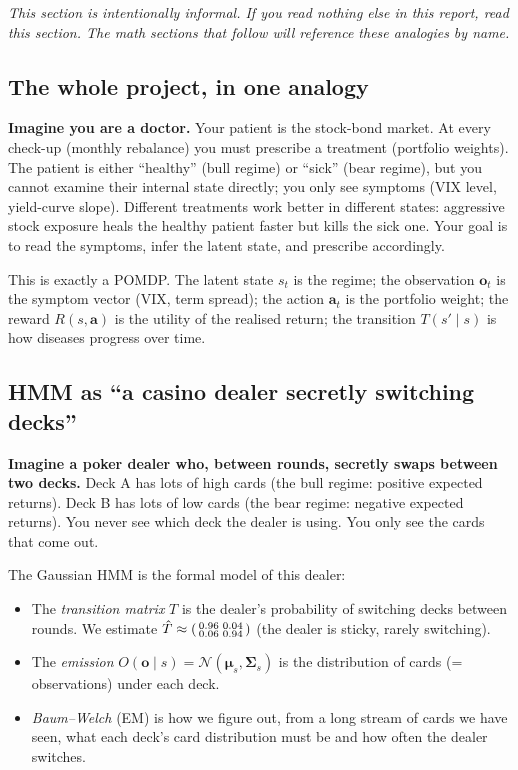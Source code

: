 \documentclass[11pt]{article}
\theoremstyle{plain1}
\theoremstyle{definition1}
\newcommand{\1}{\mathbf{1}}
\begin{document}
\textit{This section is intentionally informal. If you read nothing else in this report, read this section. The math sections that follow will reference these analogies by name.}

\subsection{The whole project, in one analogy}

\textbf{Imagine you are a doctor.} Your patient is the stock-bond market. At every check-up (monthly rebalance) you must prescribe a treatment (portfolio weights). The patient is either ``healthy'' (bull regime) or ``sick'' (bear regime), but you cannot examine their internal state directly; you only see symptoms (VIX level, yield-curve slope). Different treatments work better in different states: aggressive stock exposure heals the healthy patient faster but kills the sick one. Your goal is to read the symptoms, infer the latent state, and prescribe accordingly.

This is exactly a POMDP. The latent state $s_t$ is the regime; the observation $\mathbf{o}_t$ is the symptom vector (VIX, term spread); the action $\mathbf{a}_t$ is the portfolio weight; the reward $R(s,\mathbf{a})$ is the utility of the realised return; the transition $T(s'\mid s)$ is how diseases progress over time.

\subsection{HMM as ``a casino dealer secretly switching decks''}

\textbf{Imagine a poker dealer who, between rounds, secretly swaps between two decks.} Deck A has lots of high cards (the bull regime: positive expected returns). Deck B has lots of low cards (the bear regime: negative expected returns). You never see which deck the dealer is using. You only see the cards that come out.

The Gaussian HMM is the formal model of this dealer:
\begin{itemize}[leftmargin=1.5em,itemsep=2pt]
  \item The \emph{transition matrix} $T$ is the dealer's probability of switching decks between rounds. We estimate $\hat T \approx \begin{psmallmatrix}0.96 & 0.04\\ 0.06 & 0.94\end{psmallmatrix}$ (the dealer is sticky, rarely switching).
  \item The \emph{emission} $O(\mathbf{o}\mid s) = \mathcal{N}(\boldsymbol\mu_s, \boldsymbol\Sigma_s)$ is the distribution of cards (= observations) under each deck.
  \item \emph{Baum--Welch} (EM) is how we figure out, from a long stream of cards we have seen, what each deck's card distribution must be and how often the dealer switches.
\end{itemize}
\end{document}
